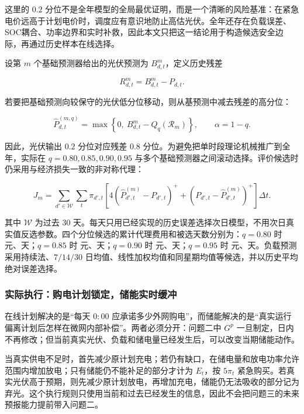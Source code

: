 这里的 $0.2$ 分位不是全年模型的全局最优证明，而是一个清晰的风险基准：在紧急电价远高于计划电价时，调度应有意识地防止高估光伏。全年还存在负载误差、SOC耦合、功率边界和实时补救，因此本文只把这一结论用于构造候选安全边际，再通过历史样本在线选择。

设第 $m$ 个基础预测器给出的光伏预测为 $B^m_{d,t}$，定义历史残差

\begin{equation}
    R^m_{d,t}=B^m_{d,t}-P_{d,t}.
    \label{eq:pv-residual}
\end{equation}

若要把基础预测向较保守的光伏低分位移动，则从基预测中减去残差的高分位：

\begin{equation}
    \hat P^{(m,q)}_{d,t}=\max\left\{0,\ B^m_{d,t}-Q_q(\mathcal R_m)\right\},
    \qquad \alpha=1-q.
    \label{eq:pv-forecast}
\end{equation}

因此，光伏输出 $0.2$ 分位对应残差 $0.8$ 分位。为避免把单时段理论机械推广到全年，实际在 $q=0.80,0.85,0.90,0.95$ 与多个基础预测器之间滚动选择。评价候选时仍采用与经济损失一致的非对称代理：

\begin{equation}
    J_m=\sum_{d'\in\mathcal W}\sum_t\pi_{d',t}\left[
    4(\hat P^{(m)}_{d',t}-P_{d',t})^+
    +(P_{d',t}-\hat P^{(m)}_{d',t})^+\right]\Delta t .
    \label{eq:pv-score}
\end{equation}

其中 $\mathcal W$ 为过去 $30$ 天。每天只用已经实现的历史误差选择次日模型，不用次日真实值反选参数。四个分位候选的累计代理费用和被选天数分别为：$q=0.80$ 时 \PvQuantEightyScore 元、\PvQuantEightyDays 天；$q=0.85$ 时 \PvQuantEightyFiveScore 元、\PvQuantEightyFiveDays 天；$q=0.90$ 时 \PvQuantNinetyScore 元、\PvQuantNinetyDays 天；$q=0.95$ 时 \PvQuantNinetyFiveScore 元、\PvQuantNinetyFiveDays 天。负载预测采用持续法、$7/14/30$ 日均值、线性加权均值和同星期均值等候选，并以历史平均绝对误差选择。

\subsubsection{实际执行：购电计划锁定，储能实时缓冲}

在线计划解决的是“每天 $0{:}00$ 应承诺多少外网购电”，而储能解决的是“真实运行偏离计划后怎样在微网内部补偿”。两者必须分开：问题二中 $G^p$ 一旦制定，日内不再修改；但当前真实光伏、负载和储电量已经发生后，可以改变当期储能动作。

当真实供电不足时，首先减少原计划充电；若仍有缺口，在储电量和放电功率允许范围内增加放电；只有储能仍不能补足的部分才计为 $E_t$，按 $5\pi_t$ 紧急购买。若真实光伏高于预期，则先减少原计划放电，再增加充电，储能仍无法吸收的部分记为弃光。这个执行规则只使用当前和过去已经发生的信息，因此不会把问题三的未来预报能力提前带入问题二。

